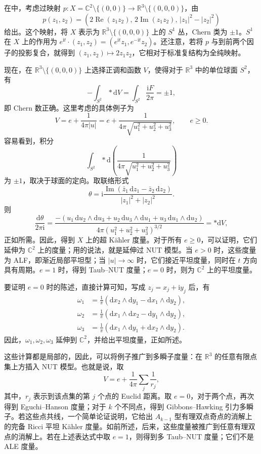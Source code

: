 \begin{example}\label{ex:7.5}
在中，考虑过映射 $p\colon X=\mathbb C^2\setminus\{(0,0)\}\to\mathbb R^3\setminus\{(0,0,0)\}$，由
\[
p(z_1,z_2)=(2\operatorname{Re}(z_1z_2),\,2\operatorname{Im}(z_1z_2),\,|z_1|^2-|z_2|^2)
\]
给出。这个映射，将 $X$ 表示为 $\mathbb R^3\setminus\{(0,0,0)\}$ 上的 $S^1$ 丛，Chern 类为 $\pm1$。$S^1$ 在 $X$ 上的作用为 $e^{\mathrm it}\cdot(z_1,z_2)=(e^{\mathrm it}z_1,e^{-\mathrm it}z_2)$。还注意，若将 $p$ 与到前两个因子的投影复合，就得到 $(z_1,z_2)\mapsto2z_1z_2$，它相对于标准复结构为全纯映射。

现在，在 $\mathbb R^3\setminus\{(0,0,0)\}$ 上选择正调和函数 $V$，使得对于 $\mathbb R^3$ 中的单位球面 $S^2$，有
\[
-\int_{S^2}*\mathrm dV=\int_{S^2}\frac{\mathrm iF}{2\pi}=\pm1,
\]
即 Chern 数正确。这里考虑的具体例子为
\[
V=e+\frac1{4\pi|u|}
=e+\frac1{4\pi\sqrt{u_1^2+u_2^2+u_3^2}},\qquad e\geq0.
\]
容易看到，积分
\[
\int_{S^2}*\mathrm d\!\left(\frac1{4\pi\sqrt{u_1^2+u_2^2+u_3^2}}\right)
\]
为 $\pm1$，取决于球面的定向。取联络形式
\[
\theta=\mathrm i\frac{\operatorname{Im}(\bar z_1\,\mathrm dz_1-\bar z_2\,\mathrm dz_2)}
{|z_1|^2+|z_2|^2}.
\]
则
\[
\frac{\mathrm d\theta}{2\pi\mathrm i}
=\frac{-(u_1\,\mathrm du_2\wedge\mathrm du_3
+u_2\,\mathrm du_3\wedge\mathrm du_1
+u_3\,\mathrm du_1\wedge\mathrm du_2)}
{4\pi(u_1^2+u_2^2+u_3^2)^{3/2}}=*\mathrm dV,
\]
正如所需。因此，得到 $X$ 上的超 Kähler 度量。对于所有 $e\geq0$，可以证明，它们延伸为 $\mathbb C^2$ 上的度量；用的说法，就是延伸过 NUT 模型。当 $e>0$ 时，这些度量为 ALF，即渐近局部平坦型；当 $|u|\to\infty$ 时，它们接近平坦度量，同时在 $t$ 方向具有周期。$e=1$ 时，得到 Taub--NUT 度量；$e=0$ 时，则为 $\mathbb C^2$ 上的平坦度量。

要证明 $e=0$ 时的陈述，直接计算可知，写成 $z_j=x_j+\mathrm i y_j$ 后，有
\[
\begin{aligned}
\omega_1&=\frac1\pi(\mathrm dx_2\wedge\mathrm dy_1-\mathrm dx_1\wedge\mathrm dy_2),\\
\omega_2&=\frac1\pi(\mathrm dx_1\wedge\mathrm dx_2-\mathrm dy_1\wedge\mathrm dy_2),\\
\omega_3&=\frac1\pi(\mathrm dx_1\wedge\mathrm dy_1+\mathrm dx_2\wedge\mathrm dy_2).
\end{aligned}
\]
因此，$\omega_1,\omega_2,\omega_3$ 延伸到 $\mathbb C^2$，并给出平坦度量，正如所述。

这些计算都是局部的，因此，可以将例子推广到多瞬子度量：在 $\mathbb R^3$ 的任意有限点集上方插入 NUT 模型。也就是说，取
\[
V=e+\frac1{4\pi}\sum_j\frac1{r_j},
\]
其中，$r_j$ 表示到该点集的第 $j$ 个点的 Euclid 距离。取 $e=0$，对于两个点，再次得到 Eguchi--Hanson 度量；对于 $k$ 个不同点，得到 Gibbons--Hawking 引力多瞬子。若这些点共线，一个简单论证说明，它给出 $A_{k-1}$ 型有理双点奇点的消解上的完备 Ricci 平坦 Kähler 度量。如前所述，后来，这些度量被推广到任意有理双点的消解上。若在上述表达式中取 $e=1$，则得到多 Taub--NUT 度量；它们不是 ALE 度量。
\end{example}

